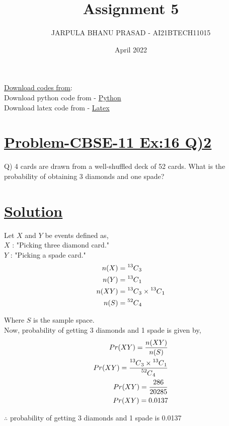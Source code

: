 \documentclass[journal,12pt,twocolumn]{IEEEtran}
\title{Assignment 5}
\author{JARPULA BHANU PRASAD - AI21BTECH11015}
\date{April 2022}
\newcommand\Mycomb[2][^n]{\prescript{#1\mkern-0.5mu}{}C_{#2}}
\begin{document}
\maketitle
\noindent \Large\underline{Download codes from}:\\
\noindent \large Download python code from - \href{https://github.com/jarpula-Bhanu/Assignment-5/blob/main/codes/verify.py}{Python}\\ Download latex code from - \href{https://github.com/jarpula-Bhanu/Assignment-5/blob/main/Assignment5.tex}{Latex}
\section{\large\underline{Problem-CBSE-11 Ex:16 Q)2}}
\large \noindent Q) 4 cards are drawn from a well-shuffled deck of 52 cards. What is the probability of obtaining 3 diamonds and one spade?
\section{\large\underline{Solution}}
\noindent Let $X$ and $Y$ be events defined as, \\
$X$ : "Picking three diamond card." \\
$Y$ : "Picking a spade card." \\
\begin{align}
n(X) &= \Mycomb[13]{3} \\
n(Y) &= \Mycomb[13]{1} \\
n(X  Y) &= \Mycomb[13]{3} \times \Mycomb[13]{1} \\
n(S) &= \Mycomb[52]{4} 
\end{align}

Where $S$ is the sample space. \\

Now, probability of getting 3 diamonds and 1 spade is given by,
\begin{align}
Pr(X  Y) = \frac{n(X  Y)}{n(S)} \\
Pr(X  Y) = \frac{\Mycomb[13]{3} \times \Mycomb[13]{1}}{\Mycomb[52]{4}} \\
Pr(X  Y) = \frac{286}{20285} \\
Pr(X  Y) = 0.0137 
\end{align}

$\therefore$ probability of getting 3 diamonds and 1 spade is 0.0137
\end{document}
